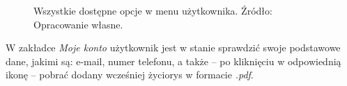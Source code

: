 \documentclass[twoside]{projektInzynierskiMS}
\numberwithin{figure}{section}
\begin{document}
\begin{figure}[h!]
\caption{Wszystkie dostępne opcje w menu użytkownika. Źródło: Opracowanie własne.}
\label{fig:mobile_menu_view}
\end{figure}
\newpage
W zakładce \textit{Moje konto} użytkownik jest w stanie sprawdzić swoje podstawowe dane, jakimi są: e-mail, numer telefonu, a także -- po kliknięciu w odpowiednią ikonę -- pobrać dodany wcześniej życiorys w formacie \textit{.pdf}.
\end{document}
